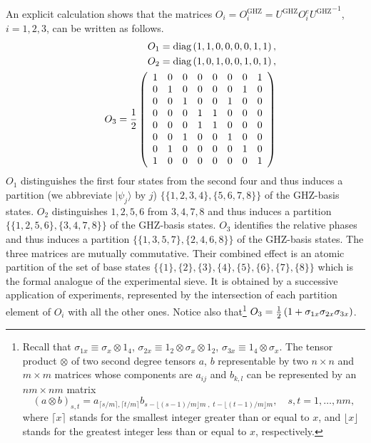 An explicit calculation shows that the matrices $O_i=O^{\textrm{GHZ}}_i=U^{\textrm{GHZ}} O^e_i {U^{\textrm{GHZ}}}^{-1}$, $i=1,2,3$,
can be written as follows.
\begin{eqnarray}
&&O_1=\textrm{diag}\left(1,1,0,0,0,0,1,1\right)\label{2001-principle-e11},\\
&&O_2=\textrm{diag}\left(1,0,1,0,0,1,0,1\right),\\
&&O_3={1\over 2}\left(\begin{array}{rrrrrrrr}
1 & 0 & 0 & 0 & 0 & 0 & 0 & 1 \\
0 & 1 & 0 & 0 & 0 & 0 & 1 & 0 \\
0 & 0 & 1 & 0 & 0 & 1 & 0 & 0 \\
0 & 0 & 0 & 1 & 1 & 0 & 0 & 0 \\
0 & 0 & 0 & 1 & 1 & 0 & 0 & 0 \\
0 & 0 & 1 & 0 & 0 & 1 & 0 & 0 \\
0 & 1 & 0 & 0 & 0 & 0 & 1 & 0 \\
1 & 0 & 0 & 0 & 0 & 0 & 0 & 1
\end{array}\right)   \label{2001-principle-e13}
\end{eqnarray}
$O_1$ distinguishes the first four states from the second four
and thus induces a partition
(we abbreviate $|\psi_j\rangle $ by $j$)
$\{
\{1 ,2 ,3 , 4 \},
\{5 ,6 ,7 , 8 \}
\}$
of the GHZ-basis states.
$O_2$ distinguishes ${1,2,5,6}$ from ${3,4,7,8}$
and thus induces a partition
$\{
\{1 ,2 ,5 , 6 \},
\{3 ,4 ,7 , 8 \}
\}$
of the GHZ-basis states.
$O_3$ identifies the relative phases
and thus induces a partition
$\{
\{1 ,3 ,5 , 7 \},
\{2 ,4 ,6 , 8 \}
\}$
of the GHZ-basis states.
The three matrices are mutually commutative.
Their combined effect is an atomic partition of the set of base states
$\{
\{1\} ,\{2\} ,\{3\} , \{4 \},
\{5\} ,\{6\} ,\{7\} , \{8 \}
\}$
which is the formal analogue of the experimental sieve.
It is obtained by a successive application of experiments,
represented by the intersection
of each partition element of $O_i$ with all the other ones.
Notice also that\footnote{Recall that
$\sigma_{1x}\equiv \sigma_x\otimes 1_4$,
$\sigma_{2x}\equiv 1_2 \otimes \sigma_x\otimes 1_2$,
$\sigma_{3x}\equiv 1_4\otimes \sigma_x$.
The tensor product $\otimes $ of two second degree tensors $a$, $b$ representable by two
$n\times n$ and $m\times m$ matrices
whose components are $a_{ij}$ and $b_{k,l}$ can be represented by an $nm\times nm$  matrix
$$(a\otimes b)_{s,t}=
    a_{\lceil s/m\rceil , \lceil t/m\rceil }
      b_{s - \lfloor (s - 1)/m\rfloor m\; ,\;
          t - \lfloor (t - 1)/m\rfloor m}, \quad {s,t= 1,\ldots, nm},
$$
where $\lceil x\rceil$ stands for the smallest integer greater than or equal to $x$,
and $\lfloor x\rfloor$ stands for the greatest integer less than or equal to $x$, respectively.
}
$
O_3={1\over 2}\left(1+\sigma_{1x}\sigma_{2x}\sigma_{3x} \right)
$.

